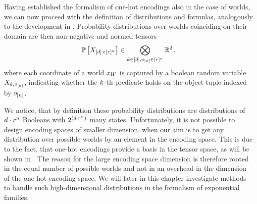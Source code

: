 






Having established the formalism of one-hot encodings also in the case of \firstOrderLogic{} worlds, we can now proceed with the definition of distributions and formulas, analogously to the development in .
Probability distributions over worlds coinciding on their domain are then non-negative and normed tensors
\begin{align*}
    \mathbb{P}\left[X_{[d]\times[r]^{n}}\right] \in \bigotimes_{k\in[d],o_{[n]}\in[r]^{n}} \mathbb{R}^2 \, .
\end{align*}
where each coordinate of a world $x_{W}$ is captured by a boolean random variable $X_{k,o_{[n]}}$, indicating whether the $k$-th predicate holds on the object tuple indexed by $o_{[n]}$.

We notice, that by definition these probability distributions are distributions of $d\cdot r^{n}$ Booleans with $2^{\left(d\cdot r^{n}\right)}$ many states.
Unfortunately, it is not possible to design encoding spaces of smaller dimension, when our aim is to get any distribution over possible worlds by an element in the encoding space.
This is due to the fact, that one-hot encodings provide a basis in the tensor space, as will be shown in .
The reason for the large encoding space dimension is therefore rooted in the equal number of possible worlds and not in an overhead in the dimension of the one-hot encoding space.
We will later in this chapter investigate methods to handle such high-dimensional distributions in the formalism of exponential families.


